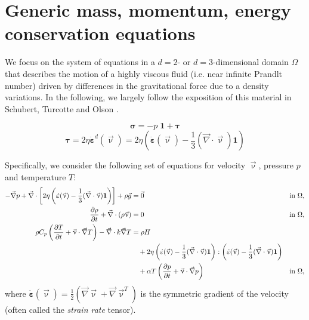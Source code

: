 \documentclass[a4paper,12pt]{article}
\begin{document}
\newpage
\section{Generic mass, momentum, energy conservation equations}

We focus on the system of equations in a $d=2$- or $d=3$-dimensional
domain $\Omega$ that describes the motion of a highly viscous fluid (i.e.
near infinite Prandlt number) driven
by differences in the gravitational force due to a density variations. 
In the following, we largely follow the exposition of this
material in Schubert, Turcotte and Olson \cite{scto01}.

\[
{\bm \sigma} = -p \; {\bm 1} + {\bm \tau}
\]
\[
{\bm \tau} = 2 \eta \dot{\bm \varepsilon}^d(\vec\upnu) = 2\eta \left(\dot{\bm \varepsilon}(\vec \upnu)
                                  - \frac{1}{3}(\vec\nabla \cdot \vec \upnu)\mathbf 1\right)
\]


Specifically, we consider the following set of equations for 
velocity $\vec\upnu$, pressure $p$ and temperature $T$:
\begin{align}
  \label{eq:stokes-1}
  - \vec\nabla p +  
  \vec\nabla \cdot \left[2\eta \left(\dot{\bm \varepsilon}(\vec \upnu)
                                  - \frac{1}{3}(\vec\nabla \cdot \vec \upnu)\mathbf 1\right)
                \right] +  \rho \vec g &= \vec{0}
  &
  & \textrm{in $\Omega$},
  \\
  \label{eq:stokes-2}
  \frac{\partial \rho}{\partial t} + \vec\nabla \cdot (\rho \vec \upnu) &= 0
  &
  & \textrm{in $\Omega$},
  \\
  \label{eq:temperature}
  \rho C_p \left(\frac{\partial T}{\partial t} + \vec \upnu\cdot\vec\nabla T\right)
  - \vec\nabla\cdot k\vec\nabla T
  &=
  \rho H
  \notag
  \\
  &\quad
  +
  2\eta
  \left(\dot\varepsilon(\vec\upnu) - \frac{1}{3}(\vec\nabla \cdot \vec \upnu)\mathbf 1\right)
  :
  \left(\dot\varepsilon(\vec\upnu) - \frac{1}{3}(\vec\nabla \cdot \vec \upnu)\mathbf 1\right)
  \\
  &\quad
  +\alpha T \left( \frac{\partial p}{\partial t} +  \vec \upnu \cdot \vec\nabla p \right)
  && \textrm{in $\Omega$},
\end{align}
where $\dot{\bm \varepsilon}(\vec\upnu) = \frac{1}{2}(\vec\nabla \vec\upnu + \vec\nabla \vec\upnu^T)$
is the symmetric gradient of the velocity (often called the
\textit{strain rate} tensor).
\end{document}
